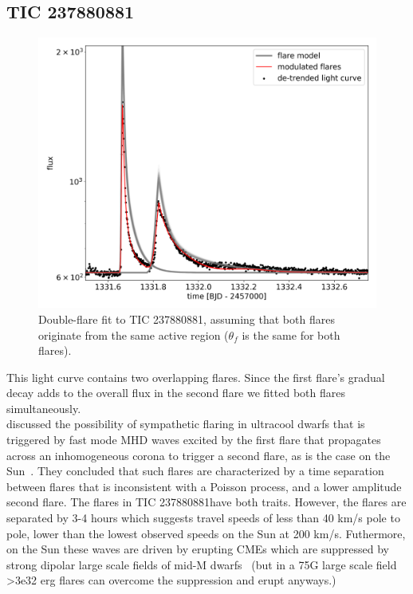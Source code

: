 \documentclass[fleqn,usenatbib,letters]{mnras}%
\newcommand{\FC}{TIC 237880881} %
\begin{document}
\subsection{\FC}

\begin{figure}
	\includegraphics[width=\columnwidth]{figures/23_12_2019_13_28_TIC237880881_flarefit_50retrievals.png}
    \caption{Double-flare fit to \FC, assuming that both flares originate from the same active region ($\theta_f$ is the same for both flares).}
    \label{fig:fit\FC}
\end{figure}
This light curve contains two overlapping flares. Since the first flare's gradual decay adds to the overall flux in the second flare we fitted both flares simultaneously.
\\
\citet{gizis2017b} discussed the possibility of sympathetic flaring in ultracool dwarfs that is triggered by fast mode MHD waves excited by the first flare that propagates across an inhomogeneous corona to trigger a second flare, as is the case on the Sun~\citep{uchida1968}. They concluded that such flares are characterized by a time separation between flares that is inconsistent with a Poisson process, and a lower amplitude second flare. The flares in \FC have both traits. However, the flares are separated by 3-4 hours which suggests travel speeds of less than 40 km/s pole to pole, lower than the lowest observed speeds on the Sun at 200 km/s. Futhermore, on the Sun these waves are driven by erupting CMEs which are suppressed by strong dipolar large scale fields of mid-M dwarfs~\citep{alvaradogomez2018} (but in a 75G large scale field >3e32 erg flares can overcome the suppression and erupt anyways.)
\end{document}
